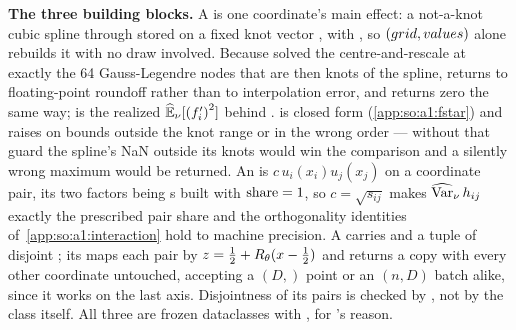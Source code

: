 \textbf{The three building blocks.} A  is one coordinate's
main effect: a not-a-knot cubic spline through stored  on a
fixed knot vector , with , so
$(\SOcode{grid}, \SOcode{values})$ alone rebuilds it with no draw involved.
Because  solved the centre-and-rescale at exactly the 64
Gauss-Legendre nodes that are then knots of the spline, 
returns  to floating-point roundoff rather than to interpolation
error, and  returns zero the same way; 
is the realized $\operatorname{\widehat{\mathbb{E}}}_\nu[{(f_i')}^2]$ behind . 
is closed form (\ref{app:so:a1:fstar}) and raises  on bounds
outside the knot range or in the wrong order --- without that guard the spline's
NaN outside its knots would win the comparison and a silently wrong maximum
would be returned. An  is $c\,u_i(x_i)u_j(x_j)$ on a
coordinate pair, its two factors being s built with
$\text{\SOcode{share}}=1$, so $c=\sqrt{s_{ij}}$ makes $\operatorname{\widehat{\mathrm{Var}}}_\nu h_{ij}$ exactly
the prescribed pair share and the orthogonality identities
of~\ref{app:so:a1:interaction} hold to machine precision. A
 carries  and a tuple of disjoint
; its  maps each pair by
$z=\tfrac12+R_\theta(x-\tfrac12)$ and returns a copy with every other coordinate
untouched, accepting a $(D,)$ point or an $(n,D)$ batch alike, since it works
on the last axis. Disjointness of its pairs is checked by
, not by the class itself. All three are frozen
dataclasses with , for 's reason.

